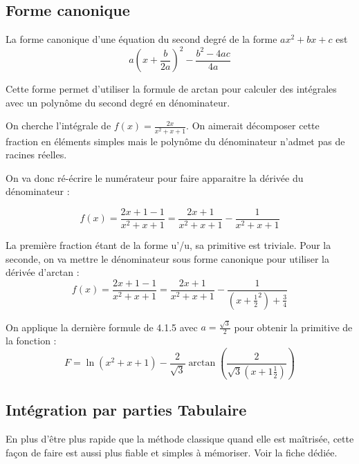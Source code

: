 \documentclass[french]{yLectureNote}
\begin{document}
\subsection{Forme canonique}
\begin{theorem}
 La forme canonique d'une équation du second degré de la forme \(ax^2+bx+c\) est \[a(x+\frac{b}{2a})^2 - \frac{b^2-4ac}{4a}\]
\end{theorem}
Cette forme permet d'utiliser la formule de arctan pour calculer des intégrales avec un polyn\^ome du second degré en dénominateur.

On cherche l'intégrale de \(f(x) = \frac{2x}{x^2+x+1}\). On aimerait décomposer cette fraction en éléments simples mais le polyn\^ome du dénominateur n'admet pas de racines réelles.

On va donc ré-écrire le numérateur pour faire apparaitre la dérivée du dénominateur :

\[f(x) = \frac{2x+1-1}{x^2+x+1} = \frac{2x+1}{x^2+x+1}-\frac{1}{x^2+x+1}\]

La première fraction étant de la forme u'/u, sa primitive est triviale. Pour la seconde, on va mettre le dénominateur sous forme canonique pour utiliser la dérivée d'arctan :
\[f(x) = \frac{2x+1-1}{x^2+x+1} = \frac{2x+1}{x^2+x+1}-\frac{1}{(x+\frac{1}{2}^2)+\frac{3}{4}}\]

On applique la dernière formule de 4.1.5 avec \(a = \frac{\sqrt{3}}{2}\) pour obtenir la primitive de la fonction :
\[F = \ln(x^2+x+1) - \frac{2}{\sqrt{3}}\arctan(\frac{2}{\sqrt{3}(x+1\frac{1}{2})})\]
\subsection{Intégration par parties Tabulaire}
En plus d'\^etre plus rapide que la méthode classique quand elle est ma\^itrisée, cette façon de faire est aussi plus fiable et simples à mémoriser. Voir la fiche dédiée.
\end{document}

